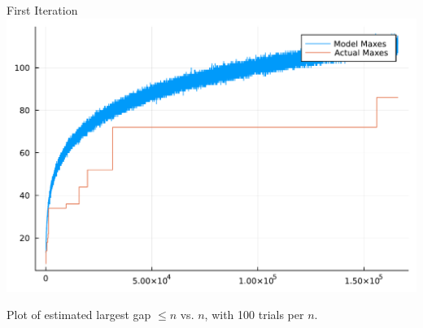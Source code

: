 \documentclass{beamer}
\begin{document}
\begin{frame}{First Iteration}
  \includegraphics[width=\textwidth]{random-plot1.pdf}

  Plot of estimated largest gap $\le n$ vs. $n$, with
  100 trials per $n$.
\end{frame}
\end{document}
